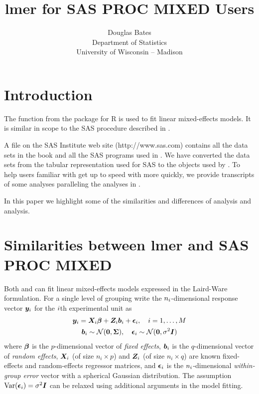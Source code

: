 \documentclass[12pt]{article}
\begin{document}
\title{\textbf{\textsf{lmer} for \textsf{SAS PROC MIXED} Users}}
\author{Douglas Bates\\Department of Statistics\\University of
  Wisconsin -- Madison\\}
\date{}
\maketitle
\section{Introduction}
\label{sec:intro}

The  function from the  package for \textsf{R} is used
to fit linear mixed-effects models.  It is similar in scope to the
\textsf{SAS} procedure  described in
\citet{litt:mill:stro:wolf:1996}.

A file on the SAS Institute web site (\textsf{http://www.sas.com})
contains all the data sets in the book and all the SAS programs used
in \citet{litt:mill:stro:wolf:1996}.  We have converted the data
sets from the tabular representation used for SAS to the
 objects used by .  To help users familiar
with  get up to speed with  more quickly,
we provide transcripts of some  analyses paralleling the
 analyses in \citet{litt:mill:stro:wolf:1996}.

In this paper we highlight some of the similarities and differences of
 analysis and  analysis.

\section{Similarities between lmer and SAS PROC MIXED}
\label{sec:similarities}

Both  and  can fit linear mixed-effects
models expressed in the Laird-Ware formulation.  For a single level of
grouping \citet{lair:ware:1982} write the $n_i\/$-dimensional
response vector $\bm{y}_i$ for the $i\/$th experimental unit as
\begin{gather}
  \label{eqn:oneLevel}
  \bm{y}_i = \bm{X}_i \bm{\beta} + \bm{Z}_i \bm{b}_i + \bm{\epsilon}_i,\quad i=1,\dots,M\\
  \bm{b}_i\sim\mathcal{N}(\bm{0},\bm{\Sigma}),
  \quad\bm{\epsilon}_i\sim\mathcal{N}(\bm{0},\sigma^2 \bm{I})\notag
\end{gather}
where $\bm{\beta}$ is the $p$-dimensional vector of \emph{fixed effects},
$\bm{b}_i$ is the $q$-dimensional vector of \emph{random effects},
$\bm{X}_i$ (of size $n_i\times p$) and $\bm{Z}_i$ (of size $n_i\times q$)
are known fixed-effects and random-effects regressor matrices, and
$\bm{\epsilon}_i$ is the $n_i\/$-dimensional \emph{within-group error} vector
with a spherical Gaussian distribution.  The assumption
$\mathrm{Var}(\bm{\epsilon}_i)=\sigma^2\bm{I}$ can be relaxed using additional
arguments in the model fitting.
\end{document}
